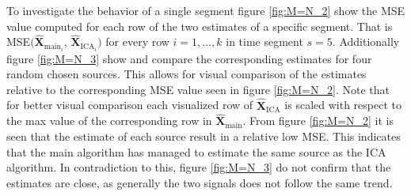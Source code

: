 \noindent
To investigate the behavior of a single segment figure \ref{fig:M=N_2} show the MSE value computed for each row of the two estimates of a specific segment. 
That is MSE$(\hat{\mathbf{X}}_{\text{main}_{i}}$, $\hat{\mathbf{X}}_{\text{ICA}_{i}})$ for every row $i = 1, \dots, k$ in time segment $s = 5$. 
Additionally figure \ref{fig:M=N_3} show and compare the corresponding estimates for four random chosen sources. 
This allows for visual comparison of the estimates relative to the corresponding MSE value seen in figure \ref{fig:M=N_2}. 
Note that for better visual comparison each visualized row of $\hat{\mathbf{X}}_{\text{ICA}}$ is scaled with respect to the max value of the corresponding row in $\hat{\mathbf{X}}_{\text{main}}$.
From figure \ref{fig:M=N_2} it is seen that the estimate of each source result in a relative low MSE. This indicates that the main algorithm has managed to estimate the same source as the ICA algorithm. 
In contradiction to this, figure \ref{fig:M=N_3} do not confirm that the estimates are close, as generally the two signals does not follow the same trend.   
